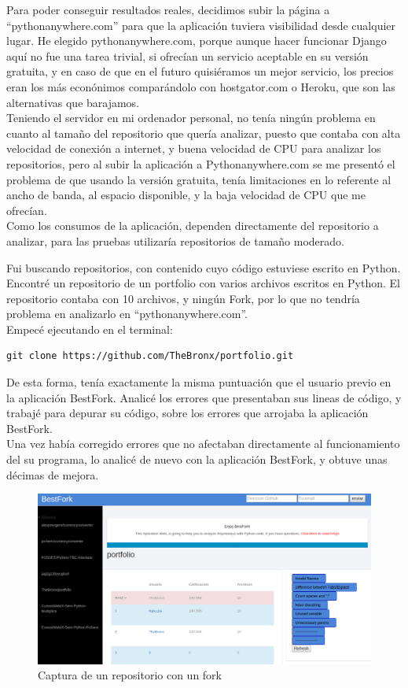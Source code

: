 \documentclass[a4paper, 12pt]{book}
\begin{document}
Para poder conseguir resultados reales, decidimos subir la página a ``pythonanywhere.com'' para que la aplicación tuviera visibilidad desde cualquier lugar. He elegido pythonanywhere.com, porque aunque hacer funcionar Django aquí no fue una tarea trivial, si ofrecían un servicio aceptable en su versión gratuita, y en caso de que en el futuro quisiéramos un mejor servicio, los precios eran los más econónimos comparándolo con hostgator.com o Heroku, que son las alternativas que barajamos.\\
Teniendo el servidor en mi ordenador personal, no tenía ningún problema en cuanto al tamaño del repositorio que quería analizar, puesto que contaba con alta velocidad de conexión a internet, y buena velocidad de CPU para analizar los repositorios, pero al subir la aplicación a Pythonanywhere.com se me presentó el problema de que usando la versión gratuita, tenía limitaciones en lo referente al ancho de banda, al espacio disponible, y la baja velocidad de CPU que me ofrecían.\\
Como los consumos de la aplicación, dependen directamente del repositorio a analizar, para las pruebas utilizaría repositorios de tamaño moderado.

Fui buscando repositorios, con contenido cuyo código estuviese escrito en Python. Encontré un repositorio de un portfolio con varios archivos escritos en Python. El repositorio contaba con 10 archivos, y ningún Fork, por lo que no tendría problema en analizarlo en ``pythonanywhere.com''.\\
Empecé ejecutando en el terminal: 
\begin{lstlisting}[frame=single]
git clone https://github.com/TheBronx/portfolio.git
\end{lstlisting}

De esta forma, tenía exactamente la misma puntuación que el usuario previo en la aplicación BestFork.
Analicé los errores que presentaban sus lineas de código, y trabajé para depurar su código, sobre los errores que arrojaba la aplicación BestFork.\\
Una vez había corregido errores que no afectaban directamente al funcionamiento del su programa, lo analicé de nuevo con la aplicación BestFork, y obtuve unas décimas de mejora.

\begin{figure}[H]
\centering
\includegraphics[scale=0.35]{img/mejora.png} 
\caption{Captura de un repositorio con un fork}
\end{figure}
\end{document}
